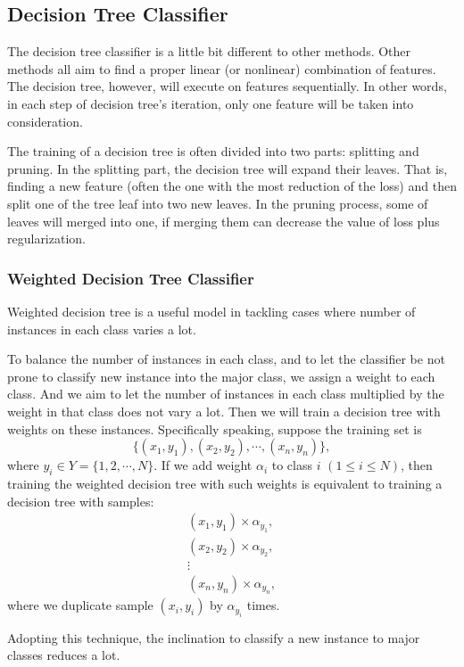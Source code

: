 \documentclass[english]{article}
\begin{document}
\subsection{Decision Tree Classifier}
\par The decision tree classifier is a little bit different to other methods. Other methods all aim to find a proper linear (or nonlinear) combination of features. The decision tree, however, will execute on features sequentially. In other words, in each step of decision tree's iteration, only one feature will be taken into consideration.
\par The training of a decision tree is often divided into two parts: splitting and pruning. In the splitting part, the decision tree will expand their leaves. That is, finding a new feature (often the one with the most reduction of the loss) and then split one of the tree leaf into two new leaves. In the pruning process, some of leaves will merged into one, if merging them can decrease the value of loss plus regularization.

\subsubsection{Weighted Decision Tree Classifier}
\label{weightdtc}
\par Weighted decision tree is a useful model in tackling cases where number of instances in each class varies a lot.
\par To balance the number of instances in each class, and to let the classifier be not prone to classify new instance into the major class, we assign a weight to each class. And we aim to let the number of instances in each class multiplied by the weight in that class does not vary a lot. Then we will train a decision tree with weights on these instances. Specifically speaking, suppose the training set is 
\begin{equation}
	\{(x_{1}, y_{1}), (x_{2}, y_{2}), \cdots, (x_{n}, y_{n})\},
\end{equation}
where $y_{i}\in Y = \{1, 2, \cdots, N\}$. If we add weight $\alpha_{i}$ to class $i$ $(1\le i\le N)$, then training the weighted decision tree with such weights is equivalent to training a decision tree with samples:
\begin{equation}
	\begin{matrix}
		(x_{1}, y_{1})\times \alpha_{y_{1}},\\
		(x_{2}, y_{2})\times \alpha_{y_{2}},\\
		\vdots\\
		(x_{n}, y_{n})\times \alpha_{y_{n}},
	\end{matrix}
\end{equation}
where we duplicate sample $(x_{i}, y_{i})$ by $\alpha_{y_{i}}$ times.
\par Adopting this technique, the inclination to classify a new instance to major classes reduces a lot.
\end{document}
